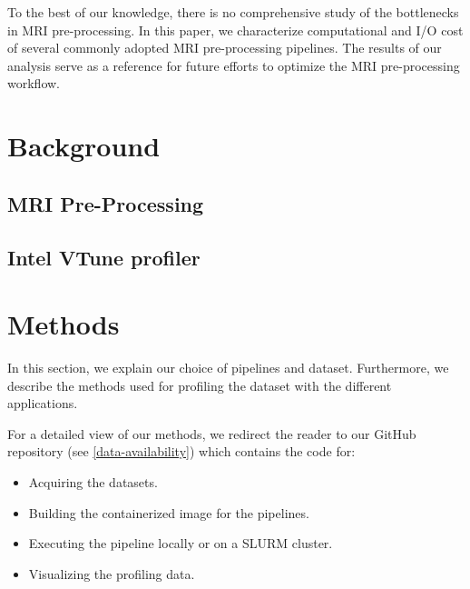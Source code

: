 \documentclass[conference]{IEEEtran}
\begin{document}
To the best of our knowledge, there is no comprehensive study of the bottlenecks in MRI pre-processing. In this paper, we characterize computational and I/O cost of several commonly adopted MRI pre-processing pipelines. The results of our analysis serve as a reference for future efforts to optimize the MRI pre-processing workflow.

\section{Background}

\subsection{MRI Pre-Processing}







\subsection{Intel VTune profiler}





\section{Methods}
In this section, we explain our choice of pipelines and dataset. Furthermore, we describe the methods used for profiling the dataset with the different applications.

For a detailed view of our methods, we redirect the reader to our GitHub repository (see \ref{data-availability}) which contains the code for:
\begin{itemize}
	\item Acquiring the datasets.
	\item Building the containerized image for the pipelines.
	\item Executing the pipeline locally or on a SLURM cluster.
	\item Visualizing the profiling data.
\end{itemize}
\end{document}
